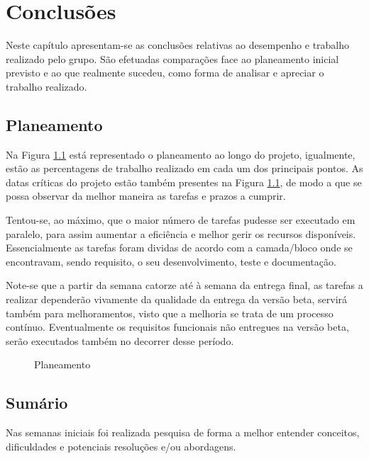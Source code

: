 %
%
\chapter{Conclusões} \label{cap4}

Neste capítulo apresentam-se as conclusões relativas ao desempenho e trabalho realizado pelo grupo. São efetuadas comparações face ao planeamento inicial previsto e ao que realmente sucedeu, como forma de analisar e apreciar o trabalho realizado.

\section{Planeamento}\label{sec41}

Na Figura \ref{planning} está representado o planeamento ao longo do projeto, igualmente, estão as percentagens de trabalho realizado em cada um dos principais pontos. As datas críticas do projeto estão também presentes na Figura \ref{planning}, de modo a que se possa observar da melhor maneira as tarefas e prazos a cumprir.

Tentou-se, ao máximo, que o maior número de tarefas pudesse ser executado em paralelo, para assim aumentar a eficiência e melhor gerir os recursos disponíveis. Essencialmente as tarefas foram dividas de acordo com a camada/bloco onde se encontravam, sendo requisito, o seu desenvolvimento, teste e documentação.


Note-se que a partir da semana catorze até à semana da entrega final, as tarefas a realizar dependerão vivamente da qualidade da entrega da versão beta, servirá também para melhoramentos, visto que a melhoria se trata de um processo contínuo. Eventualmente os requisitos funcionais não entregues na versão beta, serão executados também no decorrer desse período.
 

\begin{figure}
	\hspace{-1.75cm}
	\caption{Planeamento}
	\label{planning}
\end{figure}

\section{Sumário}\label{sec42}

Nas semanas iniciais foi realizada pesquisa de forma a melhor entender conceitos, dificuldades e potenciais resoluções e/ou abordagens. 


